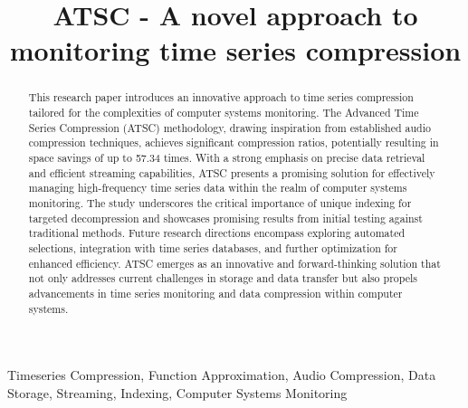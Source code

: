 \documentclass[conference]{IEEEtran}
\begin{document}
\title{ATSC - A novel approach to monitoring time series compression\\}

\author{
\and
{}
}

\maketitle

\begin{abstract}
    This research paper introduces an innovative approach to time series compression tailored for the complexities of computer systems monitoring. The Advanced Time Series Compression (ATSC) methodology, drawing inspiration from established audio compression techniques, achieves significant compression ratios, potentially resulting in space savings of up to 57.34 times. With a strong emphasis on precise data retrieval and efficient streaming capabilities, ATSC presents a promising solution for effectively managing high-frequency time series data within the realm of computer systems monitoring. The study underscores the critical importance of unique indexing for targeted decompression and showcases promising results from initial testing against traditional methods. Future research directions encompass exploring automated selections, integration with time series databases, and further optimization for enhanced efficiency. ATSC emerges as an innovative and forward-thinking solution that not only addresses current challenges in storage and data transfer but also propels advancements in time series monitoring and data compression within computer systems.
\end{abstract}
\vspace{5pt}
\begin{IEEEkeywords}
Timeseries Compression, Function Approximation, Audio Compression, Data Storage, Streaming, Indexing, Computer Systems Monitoring
\end{IEEEkeywords}
\end{document}
